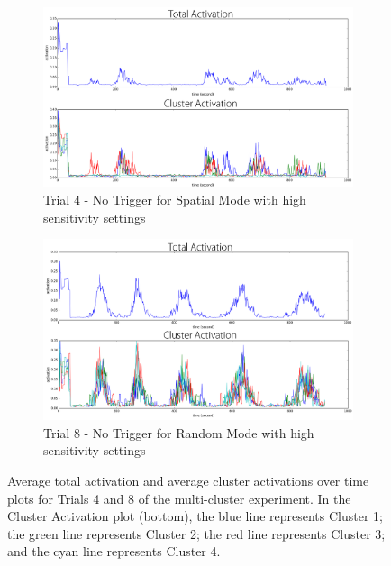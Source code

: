 \begin{figure}[!htb]
	\centering
	\begin{subfigure}[t]{0.8\textwidth}
		\centering
		\includegraphics[width=1.0 \textwidth]{"fig/validations/multicluster trial 4"}
		\caption{Trial 4 - No Trigger for Spatial Mode with high sensitivity settings}
		\label{fig:multicluster trial 4}
	\end{subfigure}
	
	\begin{subfigure}[t]{0.8\textwidth}
		\centering
		\includegraphics[width=1.0 \textwidth]{"fig/validations/multicluster trial 8"}
		\caption{Trial 8 - No Trigger for Random Mode with high sensitivity settings}
		\label{fig:multicluster trial 8}
	\end{subfigure}
	\caption[Average total activation and average cluster activations over time plots for Trials 4 and 8 of the multi-cluster experiment]{Average total activation and average cluster activations over time plots for Trials 4 and 8 of the multi-cluster experiment. In the Cluster Activation plot (bottom), the blue line represents Cluster 1; the green line represents Cluster 2; the red line represents Cluster 3; and the cyan line represents Cluster 4.}
	\label{fig:multicluster 4-8}
\end{figure}

